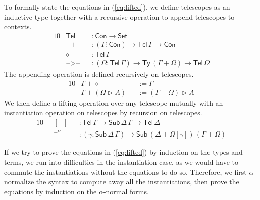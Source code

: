 \documentclass[sigplan,10pt,anonymous,review]{acmart}\settopmatter{printfolios=true,printccs=false,printacmref=false}
\newcommand{\ra}{\rightarrow}
\newcommand{\Set}{\mathsf{Set}}
\newcommand{\Ty}{\mathsf{Ty}}
\newcommand{\Con}{\mathsf{Con}}
\newcommand{\Sub}{\mathsf{Sub}}
\newcommand{\Tel}{\mathsf{Tel}}
\newcommand{\ext}{\mathop{\triangleright}}
\newcommand{\blank}{\mathord{\hspace{1pt}\text{--}\hspace{1pt}}} %
\begin{document}
To formally state the equations in (\ref{eq:lifted}), we define telescopes as an
inductive type together with a recursive operation to append telescopes to
contexts.
\begin{alignat*}{10}
  & \Tel && : \Con\ra\Set \\
  & \blank+\blank && : (\Gamma:\Con)\ra\Tel\,\Gamma\ra\Con \\
  & \diamond && : \Tel\,\Gamma \\
  & \blank\ext\blank && : (\Omega:\Tel\,\Gamma)\ra\Ty\,(\Gamma+\Omega)\ra\Tel\,\Omega
\end{alignat*}
The appending operation is defined recursively on telescopes.
\begin{alignat*}{10}
  & \Gamma+\diamond && := \Gamma \\
  & \Gamma+(\Omega\ext A) && := (\Gamma+\Omega)\ext A
\end{alignat*}
We then define a lifting operation over any telescope mutually with an
instantiation operation on telescopes by recursion on telescopes.
\begin{alignat*}{10}
  & \blank[\blank] && : \Tel\,\Gamma\ra\Sub\,\Delta\,\Gamma\ra\Tel\,\Delta \\
  & \blank^{+^\Omega} && : (\gamma:\Sub\,\Delta\,\Gamma)\ra\Sub\,(\Delta+\Omega[\gamma])\,(\Gamma+\Omega)
\end{alignat*}

If we try to prove the equations in (\ref{eq:lifted}) by induction on the types
and terms, we run into difficulties in the instantiation case, as we would have
to commute the instantiations without the equations to do so. Therefore, we
first $\alpha$-normalize the syntax to compute away all the instantiations, then
prove the equations by induction on the $\alpha$-normal forms.
\end{document}
